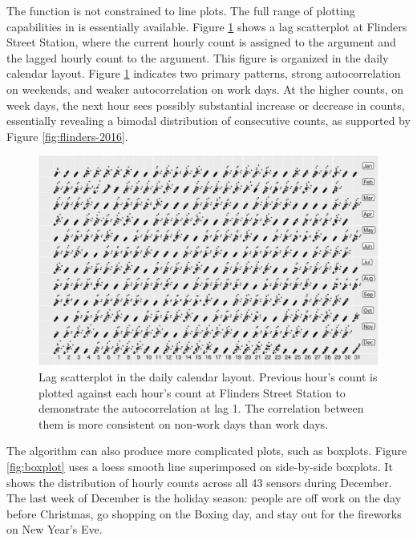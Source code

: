The  function is not constrained to line plots.
The full range of plotting capabilities in  is essentially
available. Figure \ref{fig:scatterplot} shows a lag scatterplot at
Flinders Street Station, where the current hourly count is assigned to
the  argument and the lagged hourly count to the 
argument. This figure is organized in the daily calendar layout. Figure
\ref{fig:scatterplot} indicates two primary patterns, strong
autocorrelation on weekends, and weaker autocorrelation on work days. At
the higher counts, on week days, the next hour sees possibly substantial
increase or decrease in counts, essentially revealing a bimodal
distribution of consecutive counts, as supported by Figure
\ref{fig:flinders-2016}.

\begin{Schunk}
\begin{figure}

{\centering \includegraphics[width=\textwidth]{figure/scatterplot-1} 

}

\caption[Lag scatterplot in the daily calendar layout]{Lag scatterplot in the daily calendar layout. Previous hour's count is plotted against each hour's count at Flinders Street Station to demonstrate the autocorrelation at lag 1. The correlation between them is more consistent on non-work days than work days.}\label{fig:scatterplot}
\end{figure}
\end{Schunk}

The algorithm can also produce more complicated plots, such as boxplots.
Figure \ref{fig:boxplot} uses a loess smooth line superimposed on
side-by-side boxplots. It shows the distribution of hourly counts across
all 43 sensors during December. The last week of December is the holiday
season: people are off work on the day before Christmas, go shopping on
the Boxing day, and stay out for the fireworks on New Year's Eve.

